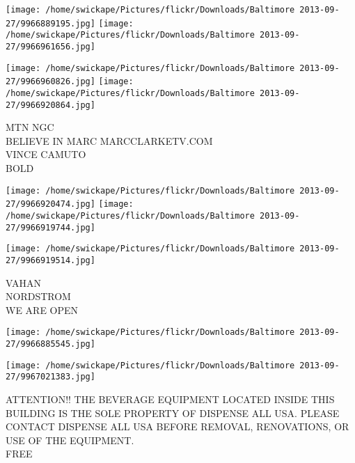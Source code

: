 \documentclass[10pt,letterpaper]{article}
\begin{document}
\texttt{[image: /home/swickape/Pictures/flickr/Downloads/Baltimore 2013-09-27/9966889195.jpg]}
\texttt{[image: /home/swickape/Pictures/flickr/Downloads/Baltimore 2013-09-27/9966961656.jpg]}

\texttt{[image: /home/swickape/Pictures/flickr/Downloads/Baltimore 2013-09-27/9966960826.jpg]}
\texttt{[image: /home/swickape/Pictures/flickr/Downloads/Baltimore 2013-09-27/9966920864.jpg]}

MTN NGC\\
BELIEVE IN MARC MARCCLARKETV.COM\\
VINCE CAMUTO\\
BOLD\\
\pagebreak

\texttt{[image: /home/swickape/Pictures/flickr/Downloads/Baltimore 2013-09-27/9966920474.jpg]}
\texttt{[image: /home/swickape/Pictures/flickr/Downloads/Baltimore 2013-09-27/9966919744.jpg]}

\texttt{[image: /home/swickape/Pictures/flickr/Downloads/Baltimore 2013-09-27/9966919514.jpg]}

VAHAN\\
NORDSTROM\\
WE ARE OPEN\\
\pagebreak

\texttt{[image: /home/swickape/Pictures/flickr/Downloads/Baltimore 2013-09-27/9966885545.jpg]}

\vspace{0.25in}
\texttt{[image: /home/swickape/Pictures/flickr/Downloads/Baltimore 2013-09-27/9967021383.jpg]}

ATTENTION!! THE BEVERAGE EQUIPMENT LOCATED INSIDE THIS BUILDING IS THE SOLE PROPERTY OF DISPENSE ALL USA.  PLEASE CONTACT DISPENSE ALL USA BEFORE REMOVAL, RENOVATIONS, OR USE OF THE EQUIPMENT.\\
FREE\\
\pagebreak
\end{document}
